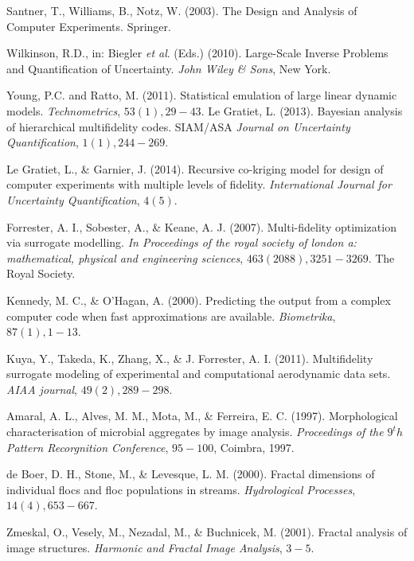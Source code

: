 \begin{thebibliography}{94}

 Santner, T., Williams, B., Notz, W. (2003). The Design and Analysis of Computer Experiments. Springer.


 Wilkinson, R.D., in: Biegler {\em et al}. (Eds.) (2010). Large-Scale Inverse Problems and Quantification of Uncertainty. {\it John Wiley \& Sons}, New York.

 Young, P.C. and Ratto, M. (2011). Statistical emulation of large linear dynamic models. {\it Technometrics}, $53(1), 29-43$.
 Le Gratiet, L. (2013). Bayesian analysis of hierarchical multifidelity codes. SIAM/ASA {\it Journal on Uncertainty Quantification}, $1(1), 244-269$.

 Le Gratiet, L., \& Garnier, J. (2014). Recursive co-kriging model for design of computer experiments with multiple levels of fidelity. {\it International Journal for Uncertainty Quantification}, $4(5).$

 Forrester, A. I., Sobester, A., \& Keane, A. J. (2007). Multi-fidelity optimization via surrogate modelling. {\it In Proceedings of the royal society of london a: mathematical, physical and engineering sciences}, $463(2088), 3251-3269$. The Royal Society.

 Kennedy, M. C., \& O'Hagan, A. (2000). Predicting the output from a complex computer code when fast approximations are available. {\it Biometrika}, $87(1), 1-13$.

 Kuya, Y., Takeda, K., Zhang, X., \& J. Forrester, A. I. (2011). Multifidelity surrogate modeling of experimental and computational aerodynamic data sets. {\it AIAA journal}, $49(2), 289-298$.


 Amaral, A. L., Alves, M. M., Mota, M., \& Ferreira, E. C. (1997). Morphological characterisation of microbial aggregates by image analysis. {\it Proceedings of the $9^th$ Pattern Recorgnition Conference}, $95-100$, Coimbra, 1997.

 de Boer, D. H., Stone, M., \& Levesque, L. M. (2000). Fractal dimensions of individual flocs and floc populations in streams. {\it Hydrological Processes}, $14(4), 653-667$.

 Zmeskal, O., Vesely, M., Nezadal, M., \& Buchnicek, M. (2001). Fractal analysis of image structures. {\it Harmonic and Fractal Image Analysis}, $3-5$.

\end{thebibliography}{}




